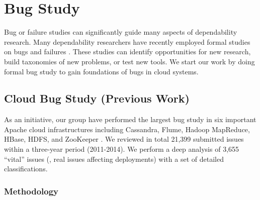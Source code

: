 \section{Bug Study}

Bug or failure studies can significantly guide many aspects of dependability
research. Many dependability researchers have recently employed formal studies
on bugs and failures \cite{Guo+13-CureIsWorse, Li+13-ScopeBugStudy}. These
studies can identify opportunities for new research, build taxonomies of new
problems, or test new tools. We start our work by doing formal bug study to gain
foundations of bugs in cloud systems.

\subsection{Cloud Bug Study (Previous Work)}

As an initiative, our group have performed the largest bug study in six
important Apache cloud infrastructures including Cassandra, Flume, Hadoop
MapReduce, HBase, HDFS, and ZooKeeper \cite{Gunawi+14-Cbs}. We reviewed in total
21,399 submitted issues within a three-year period (2011-2014).  We perform a
deep analysis of 3,655 ``vital'' issues (\ie, real issues affecting deployments)
with a set of detailed classifications.  \subsubsection{Methodology}



